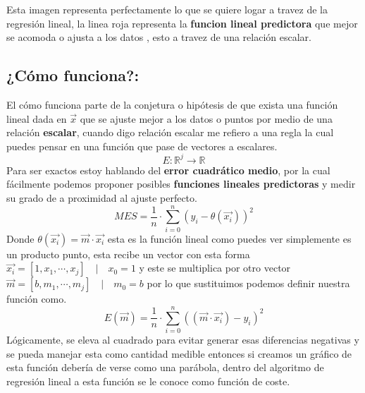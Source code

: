 \documentclass[12pt, letterpaper]{article}
\begin{document}
Esta imagen representa perfectamente lo que se quiere logar a travez de la regresión lineal,
la linea roja representa la \textbf{funcion lineal predictora} que mejor se acomoda o ajusta a los datos
, esto a travez de una relación escalar.
\subsection{¿Cómo funciona?:}
El cómo funciona parte de la conjetura o hipótesis de que exista una función lineal dada en $\vec{x}$
que se ajuste mejor a los datos
o puntos por medio de una relación \textbf{escalar}, cuando digo relación escalar
me refiero a una
regla la cual puedes pensar en una función que pase de vectores a escalares.
\[
  E: \mathbb{R}^j \rightarrow \mathbb{R}
\]
Para ser exactos estoy hablando del \textbf{error cuadrático medio}, por la cual
fácilmente podemos proponer posibles  \textbf{funciones lineales predictoras} y medir su grado
de a proximidad al ajuste perfecto.
\[
  MES = \frac{1}{n} \cdot \sum^{n}_{i = 0} (y_i - \theta(\vec{x_i}))^2
\]
Donde $\theta(\vec{x_i}) = \vec{m} \cdot \vec{x_i}$ esta es la función lineal como puedes ver
simplemente es un producto punto, esta
recibe un vector con esta forma $\vec{x_i} = [1, x_1, \cdots, x_j]\quad |\quad x_0 = 1$
y este se multiplica por otro vector $\vec{m} = [b, m_1, \cdots, m_j]\quad |\quad m_0 = b$ por lo que
sustituimos podemos definir nuestra función como.
\[
  E(\vec{m}) = \frac{1}{n} \cdot \sum^{n}_{i = 0} ((\vec{m} \cdot \vec{x_i}) - y_i)^2
\]
Lógicamente, se eleva al cuadrado para evitar generar esas diferencias negativas y se pueda manejar 
esta como cantidad medible entonces si creamos un gráfico de esta función debería de verse como una
parábola, dentro del algoritmo de regresión lineal a esta función  se le conoce como función de coste.\\

\begin{center}
\end{center}
\end{document}
